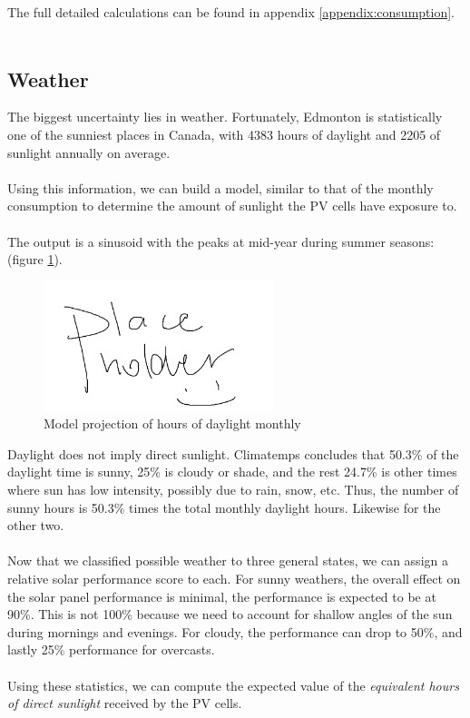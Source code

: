 \documentclass[10pt,letterpaper]{article}
\begin{document}
The full detailed calculations can be found in appendix \ref{appendix:consumption}.\\
\\
\subsection{Weather}

The biggest uncertainty lies in weather. Fortunately, Edmonton is statistically one of the sunniest places in Canada, with 4383 hours of daylight and 2205 of sunlight annually on average\cite{sunshine-canadian,climatemps}.\\
\\
Using this information, we can build a model, similar to that of the monthly consumption to determine the amount of sunlight the PV cells have exposure to.\\
\\
The output is a sinusoid with the peaks at mid-year during summer seasons: (figure \ref{fig:weather-daylight}).\\

\begin{figure}[H]
	\centering
	\includegraphics[width=0.6\textwidth]{assets/placeholder}
	\caption{Model projection of hours of daylight monthly}
	\label{fig:weather-daylight}
\end{figure}

Daylight does not imply direct sunlight. Climatemps concludes that 50.3\% of the daylight time is sunny, 25\% is cloudy or shade, and the rest 24.7\% is other times where sun has low intensity, possibly due to rain, snow, etc\cite{climatemps}. Thus, the number of sunny hours is 50.3\% times the total monthly daylight hours. Likewise for the other two.\\
\\
Now that we classified possible weather to three general states, we can assign a relative solar performance score to each. For sunny weathers, the overall effect on the solar panel performance is minimal, the performance is expected to be at 90\%. This is not 100\% because we need to account for shallow angles of the sun during mornings and evenings. For cloudy, the performance can drop to 50\%, and lastly 25\% performance for overcasts.\\
\\
Using these statistics, we can compute the expected value of the \textit{equivalent hours of direct sunlight} received by the PV cells.
\end{document}
